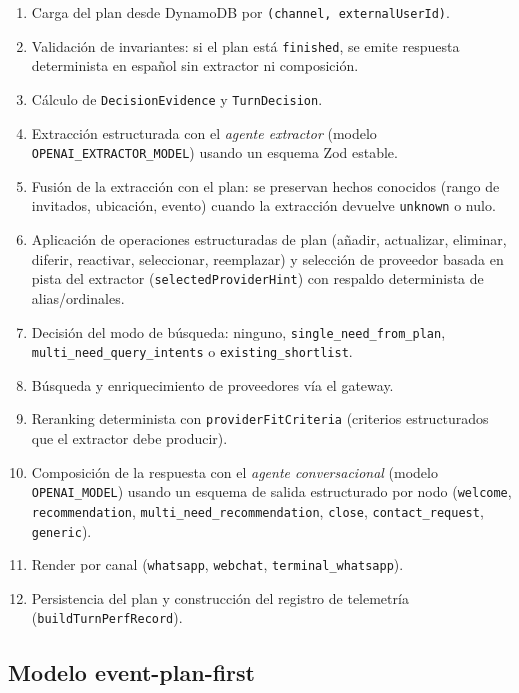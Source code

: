 \documentclass[11pt,a4paper]{article}
\begin{document}
\begin{enumerate}[leftmargin=*,itemsep=1pt]
  \item Carga del plan desde DynamoDB por
        \texttt{(channel, externalUserId)}.
  \item Validación de invariantes: si el plan está \texttt{finished}, se
        emite respuesta determinista en español sin extractor ni
        composición.
  \item Cálculo de \texttt{DecisionEvidence} y \texttt{TurnDecision}.
  \item Extracción estructurada con el \emph{agente extractor}
        (modelo \texttt{OPENAI\_EXTRACTOR\_MODEL}) usando un esquema Zod
        estable.
  \item Fusión de la extracción con el plan: se preservan hechos
        conocidos (rango de invitados, ubicación, evento) cuando la
        extracción devuelve \texttt{unknown} o nulo.
  \item Aplicación de operaciones estructuradas de plan
        (añadir, actualizar, eliminar, diferir, reactivar, seleccionar,
        reemplazar) y selección de proveedor basada en pista del
        extractor (\texttt{selectedProviderHint}) con respaldo
        determinista de alias/ordinales.
  \item Decisión del modo de búsqueda: ninguno,
        \texttt{single\_need\_from\_plan},
        \texttt{multi\_need\_query\_intents} o
        \texttt{existing\_shortlist}.
  \item Búsqueda y enriquecimiento de proveedores vía el gateway.
  \item Reranking determinista con \texttt{providerFitCriteria}
        (criterios estructurados que el extractor debe producir).
  \item Composición de la respuesta con el \emph{agente conversacional}
        (modelo \texttt{OPENAI\_MODEL}) usando un esquema de salida
        estructurado por nodo (\texttt{welcome}, \texttt{recommendation},
        \texttt{multi\_need\_recommendation}, \texttt{close},
        \texttt{contact\_request}, \texttt{generic}).
  \item Render por canal (\texttt{whatsapp}, \texttt{webchat},
        \texttt{terminal\_whatsapp}).
  \item Persistencia del plan y construcción del registro de telemetría
        (\texttt{buildTurnPerfRecord}).
\end{enumerate}

\subsection{Modelo event-plan-first}
\end{document}
